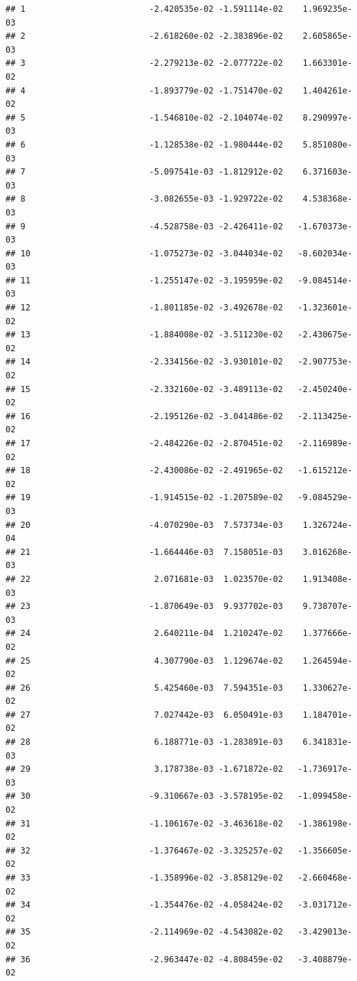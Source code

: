 \documentclass[
]{article}
\begin{document}
\begin{verbatim}
## 1                         -2.420535e-02 -1.591114e-02    1.969235e-03
## 2                         -2.618260e-02 -2.383896e-02    2.605865e-03
## 3                         -2.279213e-02 -2.077722e-02    1.663301e-02
## 4                         -1.893779e-02 -1.751470e-02    1.404261e-02
## 5                         -1.546810e-02 -2.104074e-02    8.290997e-03
## 6                         -1.128538e-02 -1.980444e-02    5.851080e-03
## 7                         -5.097541e-03 -1.812912e-02    6.371603e-03
## 8                         -3.082655e-03 -1.929722e-02    4.538368e-03
## 9                         -4.528758e-03 -2.426411e-02   -1.670373e-03
## 10                        -1.075273e-02 -3.044034e-02   -8.602034e-03
## 11                        -1.255147e-02 -3.195959e-02   -9.084514e-03
## 12                        -1.801185e-02 -3.492678e-02   -1.323601e-02
## 13                        -1.884008e-02 -3.511230e-02   -2.430675e-02
## 14                        -2.334156e-02 -3.930101e-02   -2.907753e-02
## 15                        -2.332160e-02 -3.489113e-02   -2.450240e-02
## 16                        -2.195126e-02 -3.041486e-02   -2.113425e-02
## 17                        -2.484226e-02 -2.870451e-02   -2.116989e-02
## 18                        -2.430086e-02 -2.491965e-02   -1.615212e-02
## 19                        -1.914515e-02 -1.207589e-02   -9.084529e-03
## 20                        -4.070290e-03  7.573734e-03    1.326724e-04
## 21                        -1.664446e-03  7.158051e-03    3.016268e-03
## 22                         2.071681e-03  1.023570e-02    1.913408e-03
## 23                        -1.870649e-03  9.937702e-03    9.738707e-03
## 24                         2.640211e-04  1.210247e-02    1.377666e-02
## 25                         4.307790e-03  1.129674e-02    1.264594e-02
## 26                         5.425460e-03  7.594351e-03    1.330627e-02
## 27                         7.027442e-03  6.050491e-03    1.184701e-02
## 28                         6.188771e-03 -1.283891e-03    6.341831e-03
## 29                         3.178738e-03 -1.671872e-02   -1.736917e-03
## 30                        -9.310667e-03 -3.578195e-02   -1.099458e-02
## 31                        -1.106167e-02 -3.463618e-02   -1.386198e-02
## 32                        -1.376467e-02 -3.325257e-02   -1.356605e-02
## 33                        -1.358996e-02 -3.858129e-02   -2.660468e-02
## 34                        -1.354476e-02 -4.058424e-02   -3.031712e-02
## 35                        -2.114969e-02 -4.543082e-02   -3.429013e-02
## 36                        -2.963447e-02 -4.808459e-02   -3.408879e-02

\end{verbatim}
\end{document}
